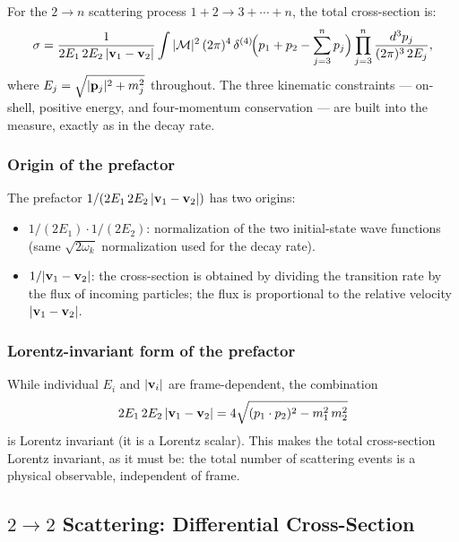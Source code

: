 \documentclass[../main.tex]{subfiles}
\begin{document}
For the $2\to n$ scattering process $1+2 \to 3+\cdots+n$, the total cross-section is:
\begin{equation}
  \sigma = \frac{1}{2E_1\,2E_2\,|\mathbf{v}_1-\mathbf{v}_2|}
  \int |\mathcal{M}|^2\,
  (2\pi)^4\,\delta^{(4)}\!\Bigl(p_1+p_2 - \sum_{j=3}^{n}p_j\Bigr)
  \prod_{j=3}^{n}\frac{d^3p_j}{(2\pi)^3\,2E_j},
  \label{eq:lec07:sigma-general}
\end{equation}
where $E_j = \sqrt{|\mathbf{p}_j|^2+m_j^2}$ throughout.  The three kinematic constraints — on-shell, positive energy, and four-momentum conservation — are built into the measure, exactly as in the decay rate.

\subsubsection*{Origin of the prefactor}

The prefactor $1/(2E_1\,2E_2\,|\mathbf{v}_1-\mathbf{v}_2|)$ has two origins:
\begin{itemize}
  \item $1/(2E_1)\cdot 1/(2E_2)$: normalization of the two initial-state wave functions (same $\sqrt{2\omega_k}$ normalization used for the decay rate).
  \item $1/|\mathbf{v}_1-\mathbf{v}_2|$: the cross-section is obtained by dividing the transition rate by the flux of incoming particles; the flux is proportional to the relative velocity $|\mathbf{v}_1-\mathbf{v}_2|$.
\end{itemize}

\subsubsection*{Lorentz-invariant form of the prefactor}

While individual $E_i$ and $|\mathbf{v}_i|$ are frame-dependent, the combination
\begin{equation}
  2E_1\,2E_2\,|\mathbf{v}_1-\mathbf{v}_2|
  = 4\sqrt{(p_1\cdot p_2)^2 - m_1^2\,m_2^2}
  \label{eq:lec07:flux-Lorentz}
\end{equation}
is Lorentz invariant (it is a Lorentz scalar).  This makes the total cross-section Lorentz invariant, as it must be: the total number of scattering events is a physical observable, independent of frame.

\subsection*{$2\to 2$ Scattering: Differential Cross-Section}
\end{document}
